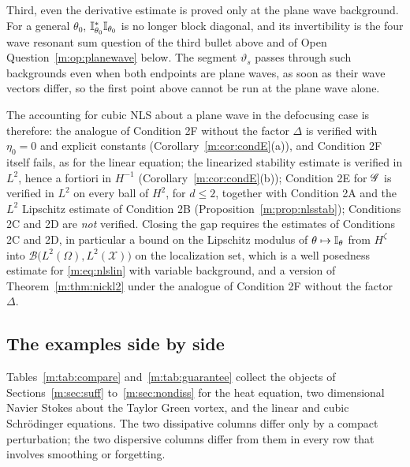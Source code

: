 \begin{remark}
Third, even the derivative estimate is proved only at the plane wave background. For a general $\theta_0$, $\mathbb{I}^*_{\theta_0}\mathbb{I}_{\theta_0}$ is no longer block diagonal, and its invertibility is the four wave resonant sum question of the third bullet above and of Open Question~\ref{m:op:planewave} below. The segment $\vartheta_s$ passes through such backgrounds even when both endpoints are plane waves, as soon as their wave vectors differ, so the first point above cannot be run at the plane wave alone.

The accounting for cubic NLS about a plane wave in the defocusing case is therefore: the analogue of Condition 2F without the factor $\Delta$ is verified with $\eta_0=0$ and explicit constants (Corollary~\ref{m:cor:condE}(a)), and Condition 2F itself fails, as for the linear equation; the linearized stability estimate is verified in $L^2$, hence a fortiori in $H^{-1}$ (Corollary~\ref{m:cor:condE}(b)); Condition 2E for $\mathscr{G}$ is verified in $L^2$ on every ball of $H^2$, for $d\le2$, together with Condition 2A and the $L^2$ Lipschitz estimate of Condition 2B (Proposition~\ref{m:prop:nlsstab}); Conditions 2C and 2D are \emph{not} verified. Closing the gap requires the estimates of Conditions 2C and 2D, in particular a bound on the Lipschitz modulus of $\theta\mapsto\mathbb{I}_\theta$ from $H^\zeta$ into $\mathcal B\big(L^2(\Omega),L^2(\mathcal X)\big)$ on the localization set, which is a well posedness estimate for \eqref{m:eq:nlslin} with variable background, and a version of Theorem~\ref{m:thm:nickl2} under the analogue of Condition 2F without the factor $\Delta$.
\end{remark}


\subsection{The examples side by side}

Tables~\ref{m:tab:compare} and~\ref{m:tab:guarantee} collect the objects of Sections~\ref{m:sec:suff} to~\ref{m:sec:nondiss} for the heat equation, two dimensional Navier Stokes about the Taylor Green vortex, and the linear and cubic Schr\"odinger equations. The two dissipative columns differ only by a compact perturbation; the two dispersive columns differ from them in every row that involves smoothing or forgetting.

